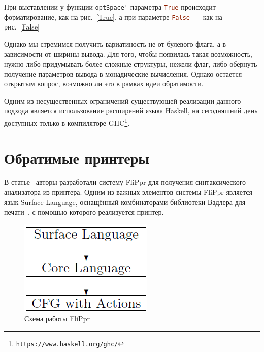 При выставлении у функции \lstinline[language=Haskell]{optSpace'} параметра 
\lstinline[language=Haskell]{True} происходит форматирование, как на рис.~\ref{True}, 
а при параметре \lstinline[language=Haskell]{False}~--- как на рис.~\ref{False}

Однако мы стремимся получить вариатиность не от булевого флага, а в зависимости от ширины вывода. 
Для того, чтобы появилась такая возможность, нужно либо придумывать более сложные структуры, 
нежели флаг, либо обернуть получение параметров вывода в монадические вычисления. Однако
остается открытым вопрос, возможно ли это в рамках идеи обратимости.

Одним из несущественных ограничений существующей реализации данного подхода является
использование расширений языка Haskell, на сегодняшний день доступных только в компиляторе
GHC\footnote{\texttt{https://www.haskell.org/ghc/}}.

\section{Обратимые принтеры}

В статье~\cite{Matsuda} авторы разработали систему FliPpr для получения синтаксического 
анализатора из принтера. Одним из важных элементов системы FliPpr является язык Surface Language, 
оснащённый комбинаторами библиотеки Вадлера для печати~\cite{WadlerPrinter}, с помощью которого 
реализуется принтер.

\begin{figure}
\vspace{-.8cm}
\centering
\includegraphics[scale=0.5]{Aliev/FliPprScheme.png}
\caption{Схема работы FliPpr}
\label{FliPpr}
\end{figure}

